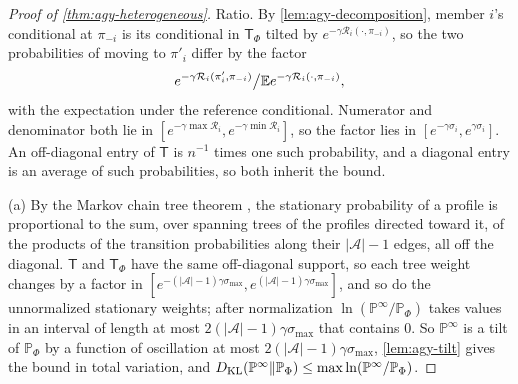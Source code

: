 \begin{proof}[Proof of \cref{thm:agy-heterogeneous}]
Ratio. By \cref{lem:agy-decomposition}, member $i$'s conditional at $\pi_{-i}$ is its conditional in $\mathsf T_\Phi$ tilted by $e^{-\gamma\mathcal R_i(\cdot,\pi_{-i})}$, so the two probabilities of moving to $\pi'_i$ differ by the factor
\begin{equation*}
e^{-\gamma\mathcal R_i(\pi'_i,\pi_{-i})}\big/\mathbb{E} e^{-\gamma\mathcal R_i(\cdot,\pi_{-i})},
\end{equation*}
with the expectation under the reference conditional. Numerator and denominator both lie in $[e^{-\gamma\max\mathcal R_i},e^{-\gamma\min\mathcal R_i}]$, so the factor lies in $[e^{-\gamma\sigma_i},e^{\gamma\sigma_i}]$. An off-diagonal entry of $\mathsf T$ is $n^{-1}$ times one such probability, and a diagonal entry is an average of such probabilities, so both inherit the bound.

(a) By the Markov chain tree theorem \citep{anantharam1989proof}, the stationary probability of a profile is proportional to the sum, over spanning trees of the profiles directed toward it, of the products of the transition probabilities along their $\lvert\mathcal A\rvert-1$ edges, all off the diagonal. $\mathsf T$ and $\mathsf T_\Phi$ have the same off-diagonal support, so each tree weight changes by a factor in $[e^{-(\lvert\mathcal A\rvert-1)\gamma\sigma_{\max}},e^{(\lvert\mathcal A\rvert-1)\gamma\sigma_{\max}}]$, and so do the unnormalized stationary weights; after normalization $\ln(\mathbb P^\infty/\mathbb P_\Phi)$ takes values in an interval of length at most $2(\lvert\mathcal A\rvert-1)\gamma\sigma_{\max}$ that contains $0$. So $\mathbb P^\infty$ is a tilt of $\mathbb P_\Phi$ by a function of oscillation at most $2(\lvert\mathcal A\rvert-1)\gamma\sigma_{\max}$, \cref{lem:agy-tilt} gives the bound in total variation, and $D_{\mathrm{KL}}(\mathbb P^\infty\Vert\mathbb P_\Phi)\le\max\ln(\mathbb P^\infty/\mathbb P_\Phi)$.


\end{proof}
